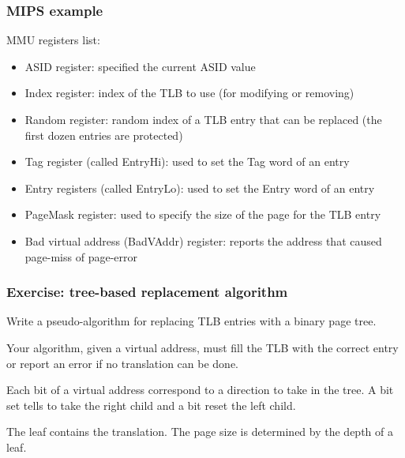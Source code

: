 
\begin{frame}
  \frametitle{MIPS example}

  MMU registers list:

  \begin{itemize}
  \item
    ASID register: specified the current ASID value
  \item
    Index register: index of the TLB to use (for modifying or removing)
  \item
    Random register: random index of a TLB entry that can be replaced
    (the first dozen entries are protected)
  \item
    Tag register (called EntryHi): used to set the Tag word of an entry
  \item
    Entry registers (called EntryLo): used to set the Entry word of an entry
  \item
    PageMask register: used to specify the size of the page for the
    TLB entry
  \item
    Bad virtual address (BadVAddr) register: reports the address that
    caused page-miss of page-error
\end{itemize}

\end{frame}


\begin{frame}
  \frametitle{Exercise: tree-based replacement algorithm}

  Write a pseudo-algorithm for replacing TLB entries with a binary
  page tree.

  \-

  Your algorithm, given a virtual address, must fill the TLB with the
  correct entry or report an error if no translation can be done.

  \-

  Each bit of a virtual address correspond to a direction to take in
  the tree. A bit set tells to take the right child and a bit reset
  the left child.

  \-

  The leaf contains the translation. The page size is determined by
  the depth of a leaf.

\end{frame}


